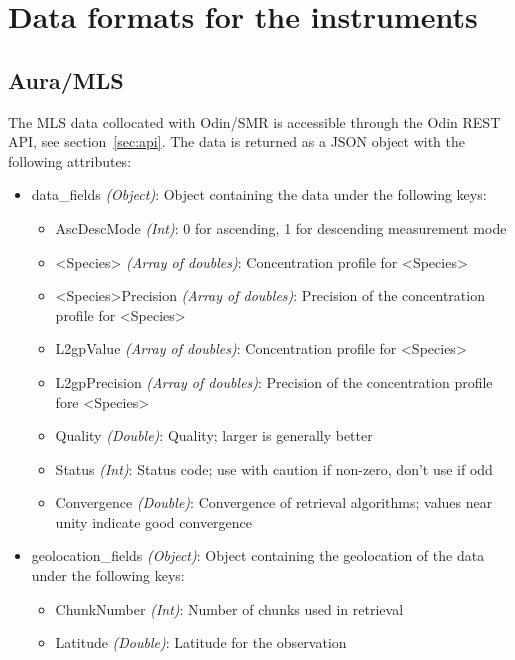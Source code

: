 \chapter{Data formats for the instruments}
\label{sec:dataformats}
\section{Aura/MLS}
The MLS data collocated with Odin/SMR is accessible through the Odin REST
API, see section~\ref{sec:api}. The data is returned as a JSON object with the
following attributes:
\begin{itemize}
    \item data\_fields \emph{(Object)}: Object containing the data under the
        following keys:
        \begin{itemize}
            \item AscDescMode \emph{(Int)}: 0 for ascending, 1 for descending
                measurement mode
            \item <Species> \emph{(Array of doubles)}: Concentration profile
                for <Species>
            \item <Species>Precision \emph{(Array of doubles)}: Precision of
                the concentration profile for <Species>
            \item L2gpValue \emph{(Array of doubles)}: Concentration profile
                for <Species>
            \item L2gpPrecision \emph{(Array of doubles)}: Precision of the
                concentration profile fore <Species>
            \item Quality \emph{(Double)}: Quality; larger is generally better
            \item Status \emph{(Int)}: Status code; use with caution if
                non-zero, don't use if odd
            \item Convergence \emph{(Double)}: Convergence of retrieval
                algorithms; values near unity indicate good convergence
        \end{itemize}
    \item geolocation\_fields \emph{(Object)}: Object containing the
        geolocation of the data under the following keys:
        \begin{itemize}
            \item ChunkNumber \emph{(Int)}: Number of chunks used in retrieval
            \item Latitude \emph{(Double)}: Latitude for the observation

\end{itemize}
\end{itemize}
